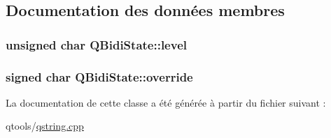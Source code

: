\subsection{Documentation des données membres}
\hypertarget{class_q_bidi_state_aa4a2250e5e3464d073acbdd50b8bd70b}{}
\subsubsection[{level}]{\setlength{\rightskip}{0pt plus 5cm}unsigned char Q\+Bidi\+State\+::level}\label{class_q_bidi_state_aa4a2250e5e3464d073acbdd50b8bd70b}
\hypertarget{class_q_bidi_state_a804b38317c22cbe9f4b548366a010e29}{}
\subsubsection[{override}]{\setlength{\rightskip}{0pt plus 5cm}signed char Q\+Bidi\+State\+::override}\label{class_q_bidi_state_a804b38317c22cbe9f4b548366a010e29}


La documentation de cette classe a été générée à partir du fichier suivant \+:\begin{DoxyCompactItemize}
\item 
qtools/\hyperlink{qstring_8cpp}{qstring.\+cpp}\end{DoxyCompactItemize}
